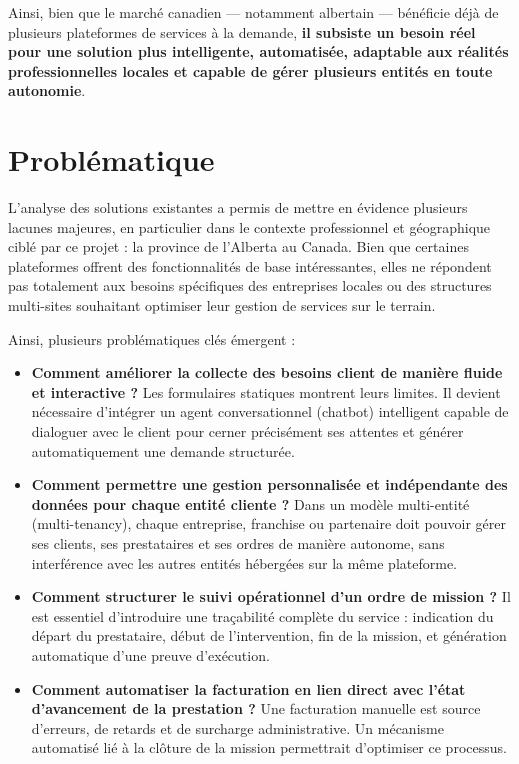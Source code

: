 \medskip

Ainsi, bien que le marché canadien — notamment albertain — bénéficie déjà de plusieurs plateformes de services à la demande, \textbf{il subsiste un besoin réel pour une solution plus intelligente, automatisée, adaptable aux réalités professionnelles locales et capable de gérer plusieurs entités en toute autonomie}.

\section{Problématique}

L’analyse des solutions existantes a permis de mettre en évidence plusieurs lacunes majeures, en particulier dans le contexte professionnel et géographique ciblé par ce projet : la province de l’Alberta au Canada. Bien que certaines plateformes offrent des fonctionnalités de base intéressantes, elles ne répondent pas totalement aux besoins spécifiques des entreprises locales ou des structures multi-sites souhaitant optimiser leur gestion de services sur le terrain.

\medskip

Ainsi, plusieurs problématiques clés émergent :

\begin{itemize}
  \item \textbf{Comment améliorer la collecte des besoins client de manière fluide et interactive ?}  
  Les formulaires statiques montrent leurs limites. Il devient nécessaire d’intégrer un agent conversationnel (chatbot) intelligent capable de dialoguer avec le client pour cerner précisément ses attentes et générer automatiquement une demande structurée.

  \item \textbf{Comment permettre une gestion personnalisée et indépendante des données pour chaque entité cliente ?}  
  Dans un modèle multi-entité (multi-tenancy), chaque entreprise, franchise ou partenaire doit pouvoir gérer ses clients, ses prestataires et ses ordres de manière autonome, sans interférence avec les autres entités hébergées sur la même plateforme.

  \item \textbf{Comment structurer le suivi opérationnel d’un ordre de mission ?}  
  Il est essentiel d’introduire une traçabilité complète du service : indication du départ du prestataire, début de l’intervention, fin de la mission, et génération automatique d’une preuve d’exécution.

  \item \textbf{Comment automatiser la facturation en lien direct avec l’état d’avancement de la prestation ?}  
  Une facturation manuelle est source d’erreurs, de retards et de surcharge administrative. Un mécanisme automatisé lié à la clôture de la mission permettrait d’optimiser ce processus.
\end{itemize}

